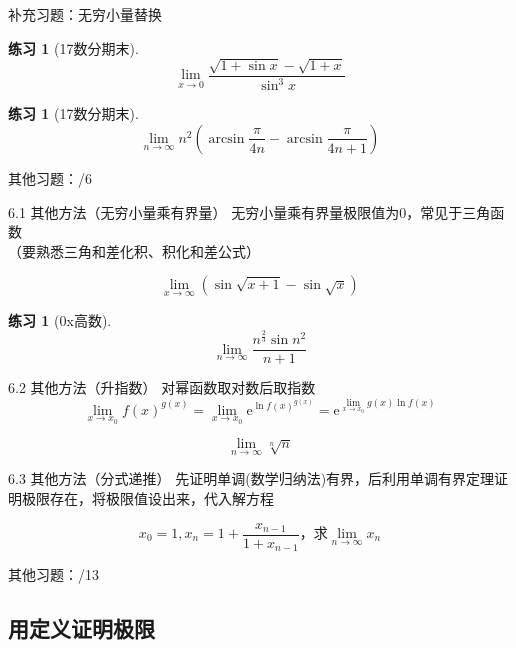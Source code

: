 \documentclass[UTF8]{ctexbeamer}
\newtheorem{exercise}[theorem]{练习} %
\begin{document}
\begin{frame}{补充习题：无穷小量替换}
\begin{exercise}[17数分期末]
\[\lim_{x\to 0}\frac{\sqrt{1+\sin x}-\sqrt{1+x}}{\sin^3 x}\]
\end{exercise}
\begin{exercise}[17数分期末]
\[\lim_{n\to\infty}n^2\left(\arcsin\frac{\pi}{4n}-\arcsin\frac{\pi}{4n+1}\right)\]
\end{exercise}
其他习题：/6
\end{frame}

\begin{frame}{6.1 其他方法（无穷小量乘有界量）}
无穷小量乘有界量极限值为$0$，常见于三角函数\\
（要熟悉三角和差化积、积化和差公式）
\begin{example}[17数分期中]
\[\lim_{x\to\infty}(\sin\sqrt{x+1}-\sin\sqrt{x})\]
\end{example}
\begin{exercise}[0x高数]
\[\lim_{n\to\infty}\frac{n^\frac{2}{3}\sin n^2}{n+1}\]
\end{exercise}
\end{frame}

\begin{frame}{6.2 其他方法（升指数）}
对幂函数取对数后取指数
\[\lim_{x\to x_0} f(x)^{g(x)}=\lim_{x\to x_0} \mathrm{e}^{\ln f(x)^{g(x)}}=\mathrm{e}^{\lim_{x\to x_0} g(x)\ln f(x)}\]
\begin{example}[\textsection 3.2例13]
\[\lim_{n\to\infty}\sqrt[n]{n}\]
\end{example}
\end{frame}

\begin{frame}{ 6.3 其他方法（分式递推）}
先证明单调(数学归纳法)有界，后利用单调有界定理证明极限存在，将极限值设出来，代入解方程
\begin{example}[\textsection 3.2/13(4)]
\[x_0=1,x_n=1+\frac{x_{n-1}}{1+x_{n-1}}\text{，求}\lim_{n\to\infty}x_n\]
\end{example}
其他习题：/13
\end{frame}

\subsection{用定义证明极限}
\begin{frame}
\subsectionpage
\end{frame}
\end{document}
